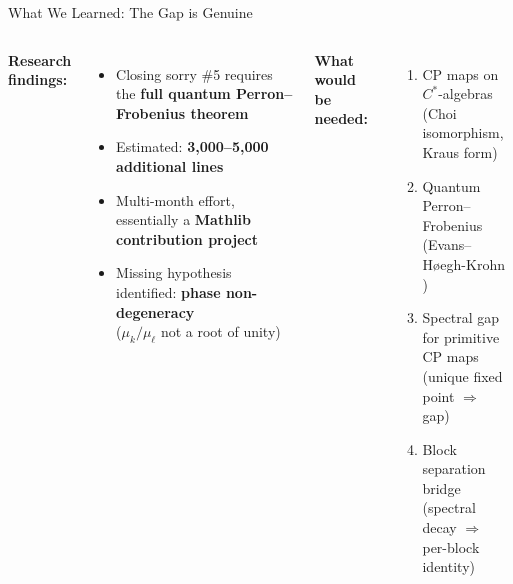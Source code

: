 \documentclass[aspectratio=169,10pt]{beamer}
\begin{document}
\begin{frame}{What We Learned: The Gap is Genuine}
\vspace{-0.3em}
\begin{columns}[T]
\textbf{Research findings:}
\begin{itemize}\itemsep0.15em
  \item {\small Closing sorry \#5 requires the \textbf{full quantum Perron--Frobenius theorem}}
  \item {\small Estimated: \textbf{3,000--5,000 additional lines}}
  \item {\small Multi-month effort, essentially a \textbf{Mathlib contribution project}}
  \item {\small Missing hypothesis identified: \textbf{phase non-degeneracy}\\
  {\scriptsize ($\mu_k/\mu_\ell$ not a root of unity)}}
\end{itemize}

\textbf{What would be needed:}
\begin{enumerate}\itemsep0.1em
  \item {\small CP maps on $C^*$-algebras\\{\scriptsize (Choi isomorphism, Kraus form)}}
  \item {\small Quantum Perron--Frobenius\\{\scriptsize (Evans--H{\o}egh-Krohn \cite{Evans1978Spectral})}}
  \item {\small Spectral gap for primitive CP maps\\{\scriptsize (unique fixed point $\Rightarrow$ gap)}}
  \item {\small Block separation bridge\\{\scriptsize (spectral decay $\Rightarrow$ per-block identity)}}
\end{enumerate}
\end{columns}

\vspace{0.3em}
\begin{center}
\end{center}
\end{frame}
\end{document}
